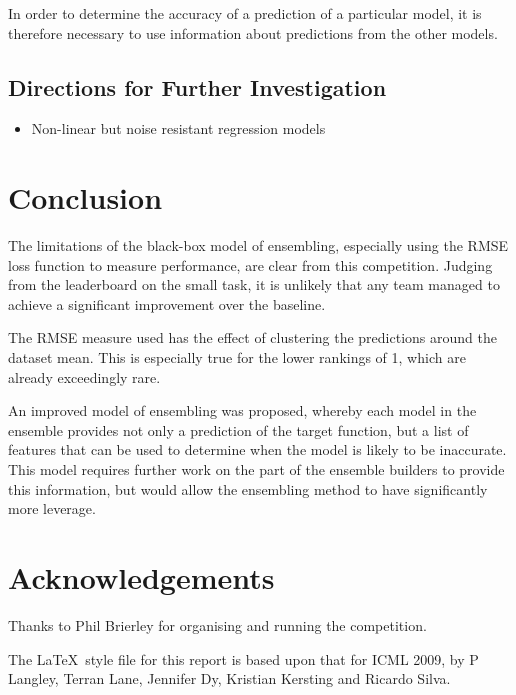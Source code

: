 \documentclass{article}
\begin{document}
In order to determine the accuracy of a prediction of a particular model, it is
therefore necessary to use information about predictions from the other models.


\subsection{}


\subsection{Directions for Further Investigation}

\begin{itemize}
\item Non-linear but noise resistant regression models
\end{itemize}


\section{Conclusion}

The limitations of the black-box model of ensembling, especially using the RMSE loss function to measure performance, are clear from this competition.  Judging from the leaderboard on the small task, it is unlikely that any team managed to achieve a significant improvement over the baseline.

The RMSE measure used has the effect of clustering the predictions around the dataset mean.  This is especially true for the lower rankings of 1, which are already exceedingly rare.

An improved model of ensembling was proposed, whereby each model in the ensemble provides not only a prediction of the target function, but a list of features that can be used to determine when the model is likely to be inaccurate.  This model requires further work on the part of the ensemble builders to provide this information, but would allow the ensembling method to have significantly more leverage.

\section*{Acknowledgements} 

Thanks to Phil Brierley for organising and running the competition.

The \LaTeX\ style file for this report is based upon that for ICML 2009, by P Langley, Terran Lane, Jennifer Dy, Kristian Kersting and Ricardo Silva.




\end{document}
